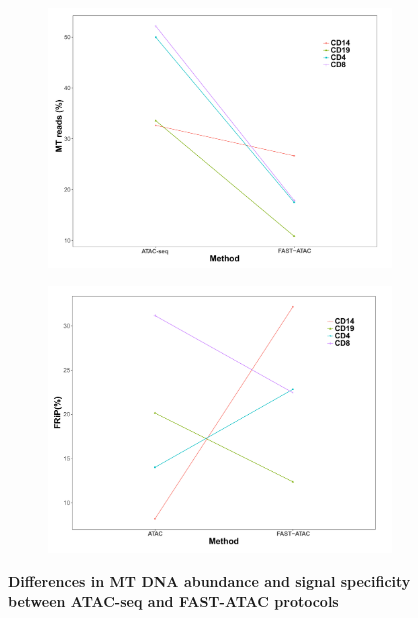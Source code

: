 \begin{figure}[htbp]
\centering
\begin{subfigure}{0.5\textwidth}
\centering
\includegraphics[width=\textwidth]{./Results1/pdfs/ATAC_vs_FAST_ATAC_percnt_MT_reads_dotplot}
\caption{\textbf{}}
\end{subfigure}%
\begin{subfigure}{0.5\textwidth}
\centering
\includegraphics[width=\textwidth]{./Results1/pdfs/ATAC_vs_FAST_ATAC_FRiP_dotplot}
\caption{\textbf{}}
\end{subfigure}
\caption[Differences in MT DNA abundance and signal specificity between ATAC-seq and FAST-ATAC protocols]{\textbf{Differences in MT DNA abundance and signal specificity between ATAC-seq and FAST-ATAC protocols}}
\label{fig:ATAC_vs_FAST_ATAC}
\end{figure} 



